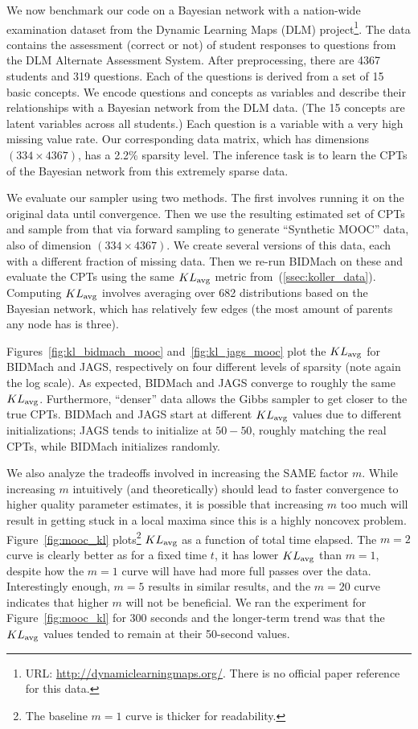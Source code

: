 \documentclass{article} %
\begin{document}
We now benchmark our code on a Bayesian network with a nation-wide examination dataset from the
Dynamic Learning Maps (DLM) project\footnote{URL: \url{http://dynamiclearningmaps.org/}. There is no
official paper reference for this data.}. The data contains the assessment (correct or not) of
student responses to questions from the DLM Alternate Assessment System. After preprocessing, there
are 4367 students and 319 questions. Each of the questions is derived from a set of 15 basic
concepts. We encode questions and concepts as variables and describe their relationships with a
Bayesian network from the DLM data. (The 15 concepts are latent variables across all students.) Each
question is a variable with a very high missing value rate.  Our corresponding data matrix, which
has dimensions $(334\times 4367)$, has a 2.2\% sparsity level. The inference task is to learn the
CPTs of the Bayesian network from this extremely sparse data.

We evaluate our sampler using two methods. The first involves running it on the original data until
convergence. Then we use the resulting estimated set of CPTs and sample from that via forward
sampling to generate ``Synthetic MOOC'' data, also of dimension $(334 \times 4367)$. We create
several versions of this data, each with a different fraction of missing data. Then we re-run
BIDMach on these and evaluate the CPTs using the same $KL_{\rm avg}$ metric
from~(\ref{ssec:koller_data}). Computing $KL_{\rm avg}$ involves averaging over 682 distributions
based on the Bayesian network, which has relatively few edges (the most amount of parents any node
has is three).

Figures~\ref{fig:kl_bidmach_mooc} and~\ref{fig:kl_jags_mooc} plot the $KL_{\rm avg}$ for BIDMach and
JAGS, respectively on four different levels of sparsity (note again the log scale). As expected,
BIDMach and JAGS converge to roughly the same $KL_{\rm avg}$. Furthermore, ``denser'' data allows
the Gibbs sampler to get closer to the true CPTs. BIDMach and JAGS start at different $KL_{\rm avg}$
values due to different initializations; JAGS tends to initialize at $50-50$, roughly matching the
real CPTs, while BIDMach initializes randomly.

We also analyze the tradeoffs involved in increasing the SAME factor $m$. While increasing $m$
intuitively (and theoretically) should lead to faster convergence to higher quality parameter
estimates, it is possible that increasing $m$ too much will result in getting stuck in a local
maxima since this is a highly noncovex problem. Figure~\ref{fig:mooc_kl} plots\footnote{The baseline
$m=1$ curve is thicker for readability.} $KL_{\rm avg}$ as a function of total time elapsed. The
$m=2$ curve is clearly better as for a fixed time $t$, it has lower $KL_{\rm avg}$ than $m=1$,
despite how the $m=1$ curve will have had more full passes over the data. Interestingly enough,
$m=5$ results in similar results, and the $m=20$ curve indicates that higher $m$ will not be
beneficial.  We ran the experiment for Figure~\ref{fig:mooc_kl} for 300 seconds and the longer-term
trend was that the $KL_{\rm avg}$ values tended to remain at their 50-second values.
\end{document}
